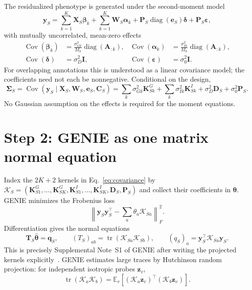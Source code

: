 \documentclass[11pt]{article}
\newcommand{\tr}{\operatorname{tr}}
\newcommand{\diag}{\operatorname{diag}}
\newcommand{\E}{\mathbb E}
\newcommand{\bI}{\bm I}
\newcommand{\bP}{\bm P}
\newcommand{\bK}{\bm K}
\newcommand{\by}{\bm y}
\newcommand{\be}{\bm e}
\newcommand{\bX}{\bm X}
\newcommand{\bW}{\bm W}
\newcommand{\bC}{\bm C}
\newcommand{\bD}{\bm D}
\begin{document}
The residualized phenotype is generated under the second-moment model
\begin{equation}
 \by_S=\sum_{k=1}^K\bX_S\bm\beta_k
       +\sum_{k=1}^K\bW_S\bm\alpha_k
       +\bP_S\diag(\be_S)\bm\delta+\bP_S\bm\varepsilon,
 \label{eq:model}
\end{equation}
with mutually uncorrelated, mean-zero effects
\begin{align*}
 \operatorname{Cov}(\bm\beta_k)&=\frac{\sigma^2_{Gk}}{M_k}
       \diag(\bm A_{:k}),&
 \operatorname{Cov}(\bm\alpha_k)&=\frac{\sigma^2_{Ik}}{M_k}
       \diag(\bm A_{:k}),\\
 \operatorname{Cov}(\bm\delta)&=\sigma_D^2\bI,&
 \operatorname{Cov}(\bm\varepsilon)&=\sigma_0^2\bI.
\end{align*}
For overlapping annotations this is understood as a linear covariance model;
the coefficients need not each be nonnegative.  Conditional on the design,
\begin{equation}
 \bm\Sigma_S=\operatorname{Cov}(\by_S\mid\bX_S,\bW_S,\be_S,\bC_S)
 =\sum_k\sigma^2_{Gk}\bK^G_{Sk}
 +\sum_k\sigma^2_{Ik}\bK^I_{Sk}
 +\sigma_D^2\bD_S+\sigma_0^2\bP_S.
 \label{eq:covariance}
\end{equation}
No Gaussian assumption on the effects is required for the moment equations.

\section{Step 2: GENIE as one matrix normal equation}

Index the $2K+2$ kernels in Eq.~\eqref{eq:covariance} by
$\mathcal K_S=(\bK^G_{S1},\ldots,\bK^G_{SK},
\bK^I_{S1},\ldots,\bK^I_{SK},\bD_S,\bP_S)$ and collect their coefficients in
$\bm\theta$.  GENIE minimizes the Frobenius loss
\begin{equation}
 \left\|\by_S\by_S^\top-\sum_a\theta_a\mathcal K_{Sa}\right\|_F^2.
\end{equation}
Differentiation gives the normal equations
\begin{equation}
 \bm T_S\widehat{\bm\theta}=\bm q_S,
 \qquad (T_S)_{ab}=\tr(\mathcal K_{Sa}\mathcal K_{Sb}),
 \qquad (q_S)_a=\by_S^\top\mathcal K_{Sa}\by_S.
 \label{eq:normal}
\end{equation}
This is precisely Supplemental Note~S1 of GENIE after writing the projected
kernels explicitly~\cite{geniesupp}.  GENIE estimates large traces by
Hutchinson random projection: for independent isotropic probes $\bm z_v$,
\begin{equation}
 \tr(\mathcal K_a\mathcal K_b)
 =\E_v[(\mathcal K_a\bm z_v)^\top(\mathcal K_b\bm z_v)].
\end{equation}
\end{document}
